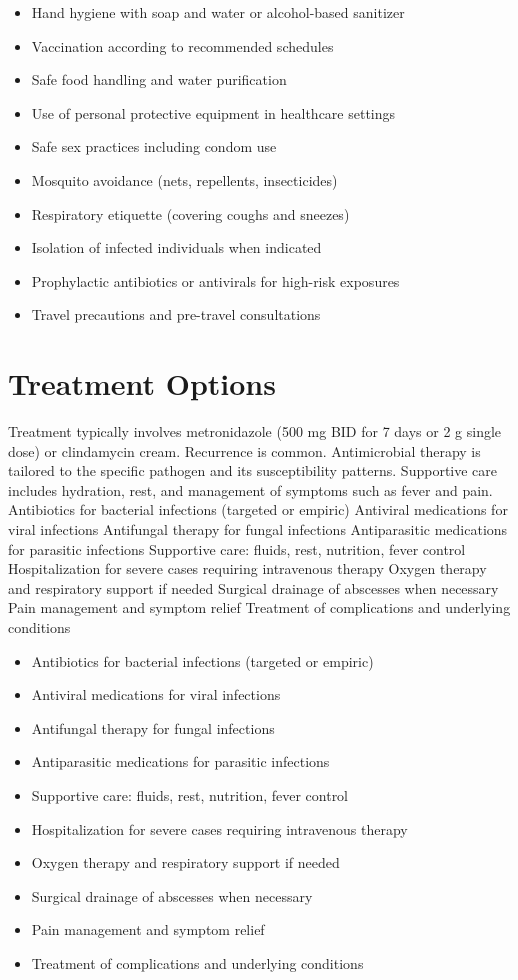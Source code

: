 \begin{itemize}[noitemsep]
  \item Hand hygiene with soap and water or alcohol-based sanitizer
  \item Vaccination according to recommended schedules
  \item Safe food handling and water purification
  \item Use of personal protective equipment in healthcare settings
  \item Safe sex practices including condom use
  \item Mosquito avoidance (nets, repellents, insecticides)
  \item Respiratory etiquette (covering coughs and sneezes)
  \item Isolation of infected individuals when indicated
  \item Prophylactic antibiotics or antivirals for high-risk exposures
  \item Travel precautions and pre-travel consultations
\end{itemize}
\section{Treatment Options}
Treatment typically involves metronidazole (500 mg BID for 7 days or 2 g single dose) or clindamycin cream. Recurrence is common. Antimicrobial therapy is tailored to the specific pathogen and its susceptibility patterns. Supportive care includes hydration, rest, and management of symptoms such as fever and pain. Antibiotics for bacterial infections (targeted or empiric) Antiviral medications for viral infections Antifungal therapy for fungal infections Antiparasitic medications for parasitic infections Supportive care: fluids, rest, nutrition, fever control Hospitalization for severe cases requiring intravenous therapy Oxygen therapy and respiratory support if needed Surgical drainage of abscesses when necessary Pain management and symptom relief Treatment of complications and underlying conditions

\begin{itemize}[noitemsep]
  \item Antibiotics for bacterial infections (targeted or empiric)
  \item Antiviral medications for viral infections
  \item Antifungal therapy for fungal infections
  \item Antiparasitic medications for parasitic infections
  \item Supportive care: fluids, rest, nutrition, fever control
  \item Hospitalization for severe cases requiring intravenous therapy
  \item Oxygen therapy and respiratory support if needed
  \item Surgical drainage of abscesses when necessary
  \item Pain management and symptom relief
  \item Treatment of complications and underlying conditions
\end{itemize}
